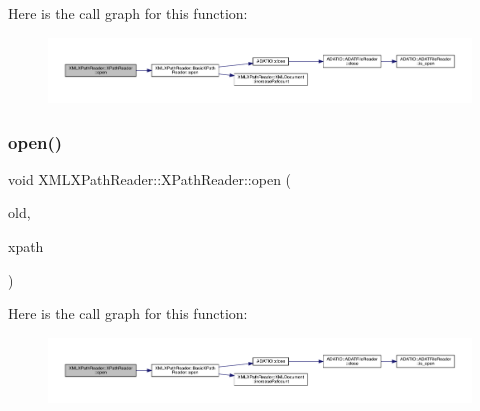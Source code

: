 Here is the call graph for this function\+:
\nopagebreak
\begin{figure}[H]
\begin{center}
\leavevmode
\includegraphics[width=350pt]{d3/d5a/classXMLXPathReader_1_1XPathReader_a55e38b40f720bb3622e3489561b1457c_cgraph}
\end{center}
\end{figure}
\mbox{\label{classXMLXPathReader_1_1XPathReader_a55e38b40f720bb3622e3489561b1457c}} 
\subsubsection{\texorpdfstring{open()}{open()}\hspace{0.1cm}{\footnotesize\ttfamily [9/9]}}
{\footnotesize\ttfamily void X\+M\+L\+X\+Path\+Reader\+::\+X\+Path\+Reader\+::open (\begin{DoxyParamCaption}\item[{\mbox{\hyperlink{classXMLXPathReader_1_1XPathReader}{X\+Path\+Reader}} \&}]{old,  }\item[{const std\+::string \&}]{xpath }\end{DoxyParamCaption})\hspace{0.3cm}{\ttfamily [inline]}}

Here is the call graph for this function\+:
\nopagebreak
\begin{figure}[H]
\begin{center}
\leavevmode
\includegraphics[width=350pt]{d3/d5a/classXMLXPathReader_1_1XPathReader_a55e38b40f720bb3622e3489561b1457c_cgraph}
\end{center}
\end{figure}
\mbox{\label{classXMLXPathReader_1_1XPathReader_a5505bd1ad902828907e2562947719fef}} 
